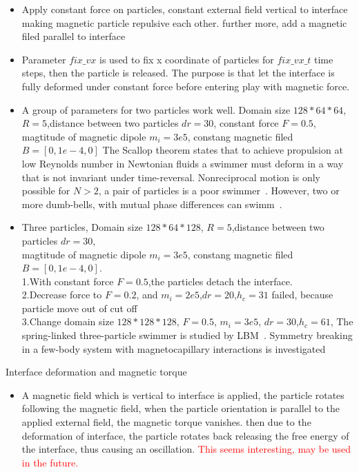 \documentclass[a4paper,10pt]{article}
\begin{document}
\begin{itemize}
 \item Apply constant force on particles, constant external field vertical to interface making magnetic particle repulsive each other.
      further more, add a magnetic filed parallel to interface
 \item Parameter $fix\_vx$ is used to fix x coordinate of particles for $fix\_vx\_t$ time steps, then the particle is released.
     The purpose is that let the interface is fully deformed under constant force
     before entering play with magnetic force.
 \item A group of parameters for two particles work well. 
      Domain size $128*64*64$, $R=5$,distance between two particles $dr=30$, constant force $F=0.5$, magtitude of magnetic dipole $m_i=3e5$, constang magnetic filed $B=[0,1e-4,0]$
      The Scallop theorem states that to achieve propulsion at low Reynolds number in Newtonian fluids a swimmer must deform in a way that is not invariant under time-reversal. 
      Nonreciprocal motion is only possible for $N>2$, a pair of particles is a poor swimmer~\cite{Lumay2013}. 
      However, two or more dumb-bells, with mutual phase differences can swimm~\cite{Alexander2008}.  
 \item  Three particles, 
       Domain size $128*64*128$, $R=5$,distance between two particles $dr=30$,\\ 
       magtitude of magnetic dipole $m_i=3e5$, constang magnetic filed $B=[0,1e-4,0]$.\\
       1.With constant force $F=0.5$,the particles detach the interface.  \\
       2.Decrease force to $F=0.2$, and $m_i=2e5$,$dr=20$,$h_c=31$ failed, because particle move out of cut off\\
       3.Change domain size $128*128*128$, $F=0.5$, $m_i=3e5$, $dr=30$,$h_c=61$,
      The spring-linked three-particle swimmer is studied by LBM~\cite{Pickl2012}.
      Symmetry breaking in a few-body system with magnetocapillary interactions is investigated~\cite{Lumay2012}
\end{itemize}
Interface deformation and magnetic torque
\begin{itemize}
 \item A magnetic field which is vertical to interface is applied, the particle rotates following the magnetic field, 
       when the particle orientation is parallel to the applied external field, the magnetic torque vanishes. then due to the deformation 
of interface, the particle rotates back releasing the free energy of the interface, thus causing an oscillation.
\textcolor{red}{This seems interesting, may be used in the future.}
\end{itemize}
\end{document}
